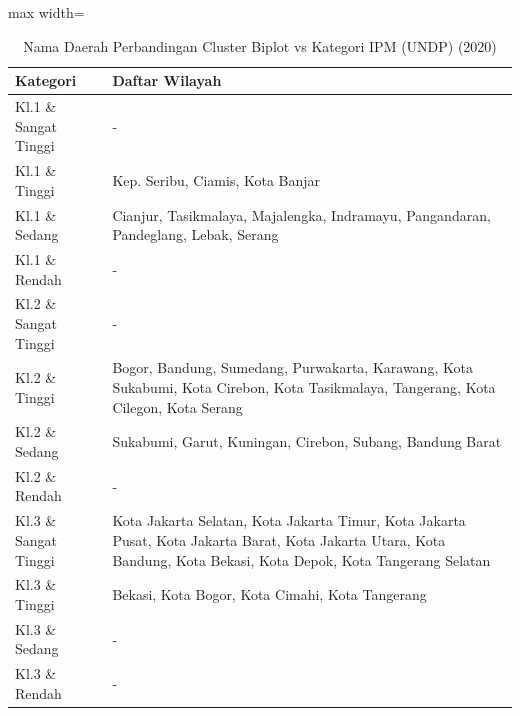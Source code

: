 \begin{table}[H]
\centering
\caption{Nama Daerah Perbandingan Cluster Biplot vs Kategori IPM (UNDP) (2020)} \label{tab:crossname2020}
\begin{adjustbox}{max width=\textwidth}
\begin{tabular}{|p{4cm}|p{10cm}|}
\hline
\textbf{Kategori} & \textbf{Daftar Wilayah} \\
\hline
Kl.1 \& Sangat Tinggi & - \\
\hline
Kl.1 \& Tinggi & Kep. Seribu, Ciamis, Kota Banjar \\
\hline
Kl.1 \& Sedang & Cianjur, Tasikmalaya, Majalengka, Indramayu, Pangandaran, Pandeglang, Lebak, Serang \\
\hline
Kl.1 \& Rendah & - \\
\hline
Kl.2 \& Sangat Tinggi & - \\
\hline
Kl.2 \& Tinggi & Bogor, Bandung, Sumedang, Purwakarta, Karawang, Kota Sukabumi, Kota Cirebon, Kota Tasikmalaya, Tangerang, Kota Cilegon, Kota Serang \\
\hline
Kl.2 \& Sedang & Sukabumi, Garut, Kuningan, Cirebon, Subang, Bandung Barat \\
\hline
Kl.2 \& Rendah & - \\
\hline
Kl.3 \& Sangat Tinggi & Kota Jakarta Selatan, Kota Jakarta Timur, Kota Jakarta Pusat, Kota Jakarta Barat, Kota Jakarta Utara, Kota Bandung, Kota Bekasi, Kota Depok, Kota Tangerang Selatan \\
\hline
Kl.3 \& Tinggi & Bekasi, Kota Bogor, Kota Cimahi, Kota Tangerang \\
\hline
Kl.3 \& Sedang & - \\
\hline
Kl.3 \& Rendah & - \\
\hline
\end{tabular}
\end{adjustbox}
\end{table}